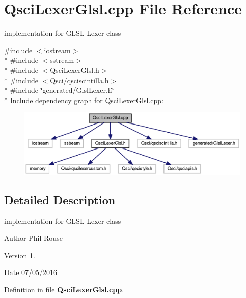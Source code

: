 \section{Qsci\-Lexer\-Glsl.\-cpp File Reference}
\label{_qsci_lexer_glsl_8cpp}


implementation for G\-L\-S\-L Lexer class  


{\ttfamily \#include $<$iostream$>$}\\*
{\ttfamily \#include $<$sstream$>$}\\*
{\ttfamily \#include $<$Qsci\-Lexer\-Glsl.\-h$>$}\\*
{\ttfamily \#include $<$Qsci/qsciscintilla.\-h$>$}\\*
{\ttfamily \#include \char`\"{}generated/\-Glsl\-Lexer.\-h\char`\"{}}\\*
Include dependency graph for Qsci\-Lexer\-Glsl.\-cpp\-:\nopagebreak
\begin{figure}[H]
\begin{center}
\leavevmode
\includegraphics[width=350pt]{_qsci_lexer_glsl_8cpp__incl}
\end{center}
\end{figure}


\subsection{Detailed Description}
implementation for G\-L\-S\-L Lexer class \begin{DoxyAuthor}{Author}
Phil Rouse 
\end{DoxyAuthor}
\begin{DoxyVersion}{Version}
1. 
\end{DoxyVersion}
\begin{DoxyDate}{Date}
07/05/2016 
\end{DoxyDate}


Definition in file {\bf Qsci\-Lexer\-Glsl.\-cpp}.

